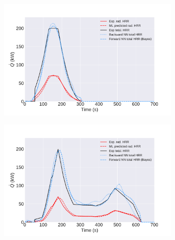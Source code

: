 \documentclass{article}
\begin{document}
\begin{figure}[htbp]
\begin{subfigure}[t]{.45\textwidth}
      \includegraphics[width=\textwidth ,keepaspectratio]{figures/t_squared_final.pdf}
      \caption{}
      \label{fig:final_result_t_squared}
  \end{subfigure}
    \begin{subfigure}[t]{.45\textwidth}
      \centering
      \includegraphics[width=\textwidth ,keepaspectratio]{figures/weird_curve_final.pdf}
      \caption{}
      \label{fig:final_result_weird_curve}
  \end{subfigure}
  \caption{} 
  \label{fig:final_burner_results}
\end{figure}
\end{document}
